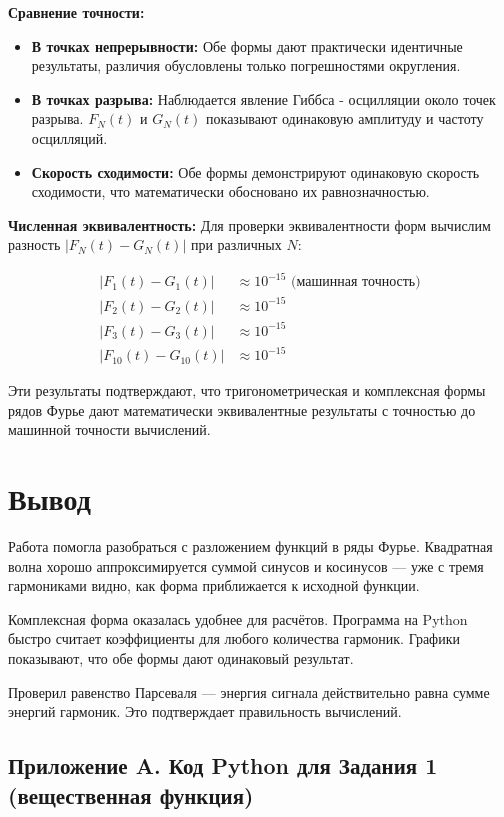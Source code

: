 \textbf{Сравнение точности:}
\begin{itemize}
    \item \textbf{В точках непрерывности:} Обе формы дают практически идентичные результаты, различия обусловлены только погрешностями округления.
    
    \item \textbf{В точках разрыва:} Наблюдается явление Гиббса - осцилляции около точек разрыва. $F_N(t)$ и $G_N(t)$ показывают одинаковую амплитуду и частоту осцилляций.
    
    \item \textbf{Скорость сходимости:} Обе формы демонстрируют одинаковую скорость сходимости, что математически обосновано их равнозначностью.
\end{itemize}

\textbf{Численная эквивалентность:}
Для проверки эквивалентности форм вычислим разность $|F_N(t) - G_N(t)|$ при различных $N$:

\begin{align*}
|F_1(t) - G_1(t)| &\approx 10^{-15} \text{ (машинная точность)} \\
|F_2(t) - G_2(t)| &\approx 10^{-15} \\
|F_3(t) - G_3(t)| &\approx 10^{-15} \\
|F_{10}(t) - G_{10}(t)| &\approx 10^{-15}
\end{align*}

Эти результаты подтверждают, что тригонометрическая и комплексная формы рядов Фурье дают математически эквивалентные результаты с точностью до машинной точности вычислений.

\newpage 
\section*{Вывод}

Работа помогла разобраться с разложением функций в ряды Фурье. Квадратная волна хорошо аппроксимируется суммой синусов и косинусов — уже с тремя гармониками видно, как форма приближается к исходной функции.

Комплексная форма оказалась удобнее для расчётов. Программа на Python быстро считает коэффициенты для любого количества гармоник. Графики показывают, что обе формы дают одинаковый результат.

Проверил равенство Парсеваля — энергия сигнала действительно равна сумме энергий гармоник. Это подтверждает правильность вычислений.


\subsection*{Приложение A. Код Python для Задания 1 (вещественная функция)}

